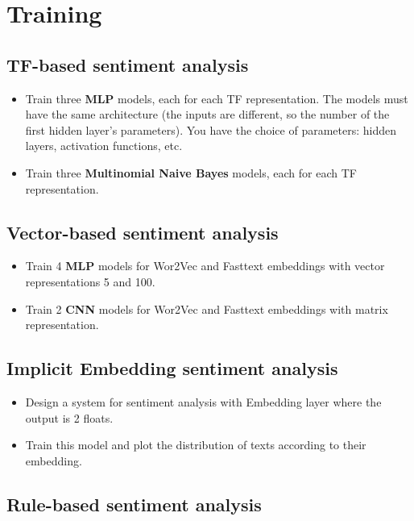 \documentclass[11pt, a4paper]{article}
\begin{document}
\section{Training}

\subsection{TF-based sentiment analysis}

\begin{itemize}
	\item Train three \textbf{MLP} models, each for each TF representation. 
	The models must have the same architecture (the inputs are different, so the number of the first hidden layer's parameters).
	You have the choice of parameters: hidden layers, activation functions, etc.
	\item Train three \textbf{Multinomial Naive Bayes} models, each for each TF representation.
\end{itemize}

\subsection{Vector-based sentiment analysis}

\begin{itemize}
	\item Train 4 \textbf{MLP} models for Wor2Vec and Fasttext embeddings with vector representations 5 and 100. 
	\item Train 2 \textbf{CNN} models for Wor2Vec and Fasttext embeddings with matrix representation.
\end{itemize}

\subsection{Implicit Embedding sentiment analysis}

\begin{itemize}
	\item Design a system for sentiment analysis with Embedding layer where the output is 2 floats. 
	\item Train this model and plot the distribution of texts according to their embedding.
\end{itemize}

\subsection{Rule-based sentiment analysis}
\end{document}
